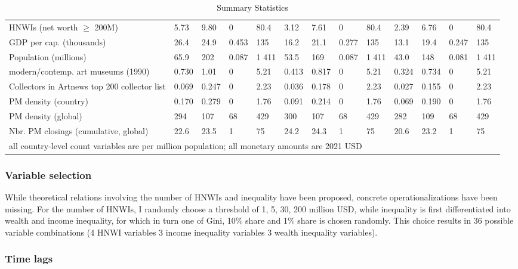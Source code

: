 \documentclass[11pt]{article}
\begin{document}
\begin{landscape}
\begin{table}[ht]
\begin{tabular}{p{7cm}llllllllllll}
  HNWIs (net worth $\geq$ 200M) & 5.73 & 9.80 & 0 & 80.4 & 3.12 & 7.61 & 0 & 80.4 & 2.39 & 6.76 & 0 & 80.4 \\ 
  GDP per cap. (thousands) & 26.4 & 24.9 & 0.453 & 135 & 16.2 & 21.1 & 0.277 & 135 & 13.1 & 19.4 & 0.247 & 135 \\ 
  Population (millions) & 65.9 & 202 & 0.087 & 1 411 & 53.5 & 169 & 0.087 & 1 411 & 43.0 & 148 & 0.081 & 1 411 \\ 
  modern/contemp. art museums (1990) & 0.730 & 1.01 & 0 & 5.21 & 0.413 & 0.817 & 0 & 5.21 & 0.324 & 0.734 & 0 & 5.21 \\ 
  Collectors in Artnews top 200 collector list & 0.069 & 0.247 & 0 & 2.23 & 0.036 & 0.178 & 0 & 2.23 & 0.027 & 0.155 & 0 & 2.23 \\ 
  PM density (country) & 0.170 & 0.279 & 0 & 1.76 & 0.091 & 0.214 & 0 & 1.76 & 0.069 & 0.190 & 0 & 1.76 \\ 
  PM density (global) & 294 & 107 & 68 & 429 & 300 & 107 & 68 & 429 & 282 & 109 & 68 & 429 \\ 
  Nbr. PM closings (cumulative, global) & 22.6 & 23.5 & 1 & 75 & 24.2 & 24.3 & 1 & 75 & 20.6 & 23.2 & 1 & 75 \\ 
   \hline \multicolumn{13}{l}{\footnotesize{all country-level count variables are per million population; all monetary amounts are 2021 USD}}
\end{tabular}
\caption{Summary Statistics} 
\label{tbl:descs}
\end{table}
\end{landscape}


\subsubsection*{Variable selection}
\label{vrbl_slctn}
While theoretical relations involving the number of HNWIs and inequality have been proposed, concrete operationalizations have been missing.
For the number of HNWIs, I randomly choose a threshold of 1, 5, 30, 200 million USD, while inequality is first differentiated into wealth and income inequality, for which in turn one of Gini, 10\% share and 1\% share is chosen randomly.
This choice results in 36 possible variable combinations (4 HNWI variables \texttimes{} 3 income inequality variables \texttimes{} 3 wealth inequality variables). 


\subsubsection*{Time lags}
\end{document}
